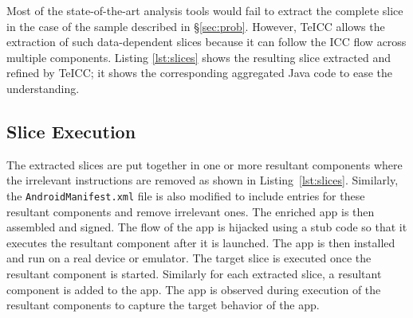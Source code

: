 Most of the state-of-the-art analysis tools would fail to extract the complete slice in the case of the sample described in \S\ref{sec:prob}. However, TeICC allows the extraction of such data-dependent slices because it can follow the ICC flow across multiple components. Listing \ref{lst:slices} shows the resulting slice extracted and refined by TeICC; it shows the corresponding aggregated Java code to ease the understanding. 

\subsection{Slice Execution}

The extracted slices are put together in one or more resultant components where the irrelevant instructions are removed as shown in Listing~\ref{lst:slices}. Similarly, the \texttt{AndroidManifest.xml} file is also modified to include entries for these resultant components and remove irrelevant ones. The enriched app is then assembled and signed. The flow of the app is hijacked using a stub code so that it executes the resultant component after it is launched. The app is then installed and run on a real device or emulator. The target slice is executed once the resultant component is started. Similarly for each extracted slice, a resultant component is added to the app. The app is observed during execution of the resultant components to capture the target behavior of the app. 


